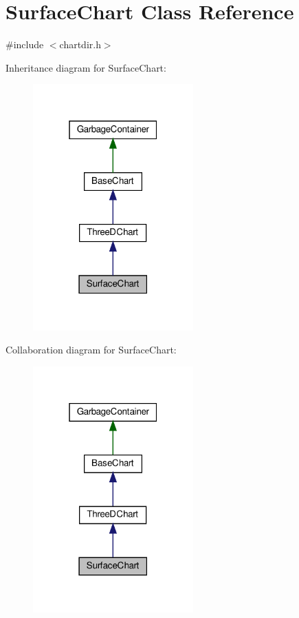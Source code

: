 \hypertarget{class_surface_chart}{}\section{Surface\+Chart Class Reference}
\label{class_surface_chart}


{\ttfamily \#include $<$chartdir.\+h$>$}



Inheritance diagram for Surface\+Chart\+:
\nopagebreak
\begin{figure}[H]
\begin{center}
\leavevmode
\includegraphics[width=175pt]{class_surface_chart__inherit__graph}
\end{center}
\end{figure}


Collaboration diagram for Surface\+Chart\+:
\nopagebreak
\begin{figure}[H]
\begin{center}
\leavevmode
\includegraphics[width=175pt]{class_surface_chart__coll__graph}
\end{center}
\end{figure}

